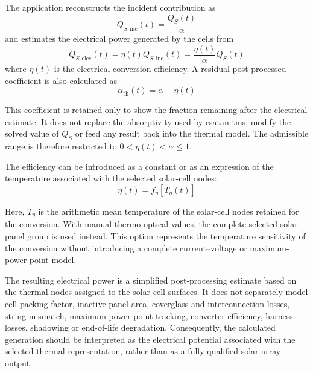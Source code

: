 The application reconstructs the incident contribution as
\begin{equation}
    Q_{S,\mathrm{inc}}(t)=\frac{Q_S(t)}{\alpha}
    \label{eq:solar_incident_power_ch8}
\end{equation}
and estimates the electrical power generated by the cells from
\begin{equation}
    Q_{S,\mathrm{elec}}(t)
    =
    \eta(t)Q_{S,\mathrm{inc}}(t)
    =
    \frac{\eta(t)}{\alpha}Q_S(t)
    \label{eq:solar_electrical_power_ch8}
\end{equation}
where $\eta(t)$ is the electrical conversion efficiency. A residual
post-processed coefficient is also calculated as
\begin{equation}
    \alpha_{\mathrm{th}}(t)=\alpha-\eta(t)
    \label{eq:solar_effective_thermal_absorptivity_ch8}
\end{equation}

This coefficient is retained only to show the fraction remaining after the
electrical estimate. It does not replace the absorptivity used by
\acrshort{esatan-tms}, modify the solved value of $Q_S$ or feed any result back
into the thermal model. The admissible range is therefore restricted to
$0<\eta(t)<\alpha\leq1$.

The efficiency can be introduced as a constant or as an expression of the
temperature associated with the selected solar-cell nodes:
\begin{equation}
    \eta(t)=f_{\eta}\!\left[T_{\eta}(t)\right]
    \label{eq:solar_efficiency_temperature_ch8}
\end{equation}

Here, $T_{\eta}$ is the arithmetic mean temperature of the solar-cell nodes
retained for the conversion. With manual thermo-optical values, the complete
selected solar-panel group is used instead. This option represents the
temperature sensitivity of the conversion without introducing a complete
current--voltage or maximum-power-point model.

The resulting electrical power is a simplified post-processing estimate based
on the thermal nodes assigned to the solar-cell surfaces. It does not
separately model cell packing factor, inactive panel area, coverglass and
interconnection losses, string mismatch, maximum-power-point tracking,
converter efficiency, harness losses, shadowing or end-of-life degradation.
Consequently, the calculated generation should be interpreted as the
electrical potential associated with the selected thermal representation,
rather than as a fully qualified solar-array output.

